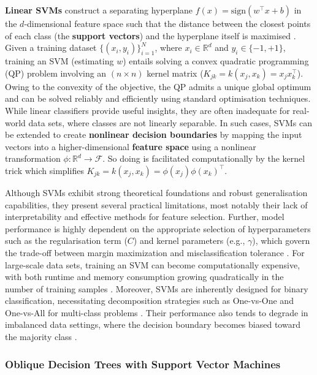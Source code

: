 \textbf{Linear SVMs} construct a separating hyperplane \(f({x}) = \text{sign}({w}^\top {x} + b)\) in the \(d\)-dimensional feature space such that the distance between the closest points of each class (the \textbf{support vectors}) and the hyperplane itself is maximised \citep{cortes1995}. Given a training dataset \(\{({x}_i, y_i)\}_{i=1}^{N}\), where \({x}_i \in \mathbb{R}^d\) and \(y_i \in \{-1, +1\}\), training an SVM (estimating \({w}\)) entails solving a convex quadratic programming (QP) problem involving an \((n \times n)\) kernel matrix (\(K_{jk} = k({x}_j, {x}_k) = {x}_j{x}_k^\top\)). Owing to the convexity of the objective, the QP admits a unique global optimum and can be solved reliably and efficiently using standard optimisation techniques. While linear classifiers provide useful insights, they are often inadequate for real-world data sets, where classes are not linearly separable. In such cases, SVMs can be extended to create \textbf{nonlinear decision boundaries} by mapping the input vectors into a higher-dimensional \textbf{feature space} using a nonlinear transformation \(\phi: \mathbb{R}^d \rightarrow \mathcal{F}\). So doing is facilitated computationally by the kernel trick which simplifies \(K_{jk} = k({x}_j, {x}_k) = \phi({x}_j)\phi({x}_k)^\top\).

Although SVMs exhibit strong theoretical foundations and robust generalisation capabilities, they present several practical limitations, most notably their lack of interpretability and effective methods for feature selection. Further, model performance is highly dependent on the appropriate selection of hyperparameters such as the regularisation term (\(C\)) and kernel parameters (e.g., \(\gamma\)), which govern the trade-off between margin maximization and misclassification tolerance \citep{nanda2018}. For large‑scale data sets, training an SVM can become computationally expensive, with both runtime and memory consumption growing quadratically in the number of training samples \citep{dong2005}. Moreover, SVMs are inherently designed for binary classification, necessitating decomposition strategies such as One-vs-One and One-vs-All for multi-class problems \citep{hsu2002}. Their performance also tends to degrade in imbalanced data settings, where the decision boundary becomes biased toward the majority class \citep{cervantes2020}.

\subsubsection{Oblique Decision Trees with Support Vector Machines}\label{oblique-decision-trees-with-support-vector-machines}


